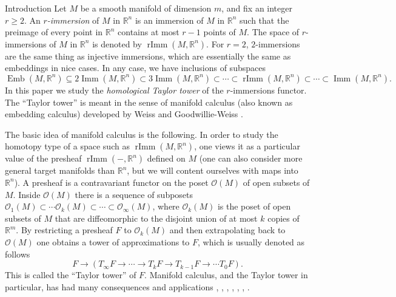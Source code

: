 \documentclass[12pt]{amsart}
\newcommand{\R}{{\mathbb R}}
\newcommand{\Emb}{\operatorname{Emb}}
\newcommand{\Imm}{\operatorname{Imm}}
\newcommand{\rImm}{\operatorname{rImm}}
\theoremstyle{plain}
\theoremstyle{definition}
\theoremstyle{remark}
\begin{document}
\tableofcontents



\parskip=5pt
\parindent=0cm








\begin{section}{Introduction}
Let $M$ be a smooth manifold of dimension $m$, and fix an integer $r\ge 2$.  An \textit{$r$-immersion} of $M$ in $\R^n$ is an immersion of $M$ in $\R^n$ such that the preimage of every point in $\R^n$ contains at most $r-1$ points of $M$. The space of $r$-immersions of $M$ in $\R^n$ is denoted by $\rImm(M, \R^n)$. For $r=2$, $2$-immersions are the same thing as injective immersions, which are essentially the same as embeddings in nice cases. In any case, we have inclusions of subspaces
\[
\Emb(M, \R^n)\subseteq 2\Imm(M, \R^n)\subset 3\Imm(M, \R^n)\subset \cdots\subset \rImm(M, \R^n)\subset \cdots \subset \Imm(M, \R^n).
\]
In this paper we study the {\it homological Taylor tower} of the $r$-immersions functor. The ``Taylor tower'' is meant in the sense of manifold calculus (also known as embedding calculus) developed by Weiss \cite{W:EI1} and Goodwillie-Weiss \cite{GW:EI2}.

The basic idea of manifold calculus is the following. In order to study the homotopy type of a space such as $\rImm(M, \R^n)$, one views it as a particular value of the presheaf $\rImm( -, \R^n)$ defined on $M$ (one can also consider more general target manifolds than $\R^n$, but we will content ourselves with maps into $\R^n$). A presheaf is a contravariant functor on the poset $\mathcal{O}(M)$ of open subsets of $M$. Inside $\mathcal{O}(M)$ there is a sequence of subposets $\mathcal{O}_1(M)\subset \cdots \mathcal{O}_k(M)\subset \cdots \subset \mathcal{O}_\infty(M)$, where $\mathcal{O}_k(M)$ is the poset of open subsets of $M$ that are diffeomorphic to the disjoint union of at most $k$ copies of $\R^m$. By restricting a presheaf $F$ to $\mathcal{O}_k(M)$ and then extrapolating back to $\mathcal{O}(M)$ one obtains a tower of approximations to $F$, which is usually denoted as follows
\[
F\to (T_\infty F \to \cdots \to T_kF \to T_{k-1}F \to \cdots T_0F).
\]
This is called the ``Taylor tower'' of $F$. Manifold calculus, and the Taylor tower in particular, has had many consequences and applications \cite{Mun05}, \cite{Vol06}, \cite{ALV07}, \cite{Mun11}, \cite{DwyerHess:LongKnots}, \cite{ST16}, \cite{BdBW18}. 


\end{section}
\end{document}
